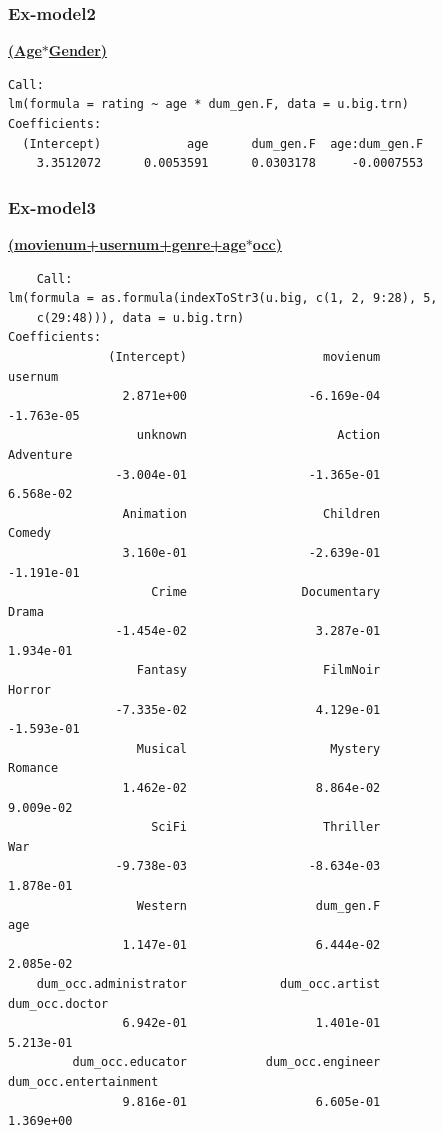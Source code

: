 \documentclass[11pt]{article}
\begin{document}
\subsubsection{Ex-model2}
\textbf{\underline{(Age$*$Gender)}}
\begin{verbatim}
Call:
lm(formula = rating ~ age * dum_gen.F, data = u.big.trn)
Coefficients:
  (Intercept)            age      dum_gen.F  age:dum_gen.F  
    3.3512072      0.0053591      0.0303178     -0.0007553 
\end{verbatim}

\subsubsection{Ex-model3}
\textbf{\underline{(movienum+usernum+genre+age$*$occ)}}
\begin{verbatim}
    Call:
lm(formula = as.formula(indexToStr3(u.big, c(1, 2, 9:28), 5, 
    c(29:48))), data = u.big.trn)
Coefficients:
              (Intercept)                   movienum                    usernum  
                2.871e+00                 -6.169e-04                 -1.763e-05  
                  unknown                     Action                  Adventure  
               -3.004e-01                 -1.365e-01                  6.568e-02  
                Animation                   Children                     Comedy  
                3.160e-01                 -2.639e-01                 -1.191e-01  
                    Crime                Documentary                      Drama  
               -1.454e-02                  3.287e-01                  1.934e-01  
                  Fantasy                   FilmNoir                     Horror  
               -7.335e-02                  4.129e-01                 -1.593e-01  
                  Musical                    Mystery                    Romance  
                1.462e-02                  8.864e-02                  9.009e-02  
                    SciFi                   Thriller                        War  
               -9.738e-03                 -8.634e-03                  1.878e-01  
                  Western                  dum_gen.F                        age  
                1.147e-01                  6.444e-02                  2.085e-02  
    dum_occ.administrator             dum_occ.artist             dum_occ.doctor  
                6.942e-01                  1.401e-01                  5.213e-01  
         dum_occ.educator           dum_occ.engineer      dum_occ.entertainment  
                9.816e-01                  6.605e-01                  1.369e+00  

\end{verbatim}
\end{document}
